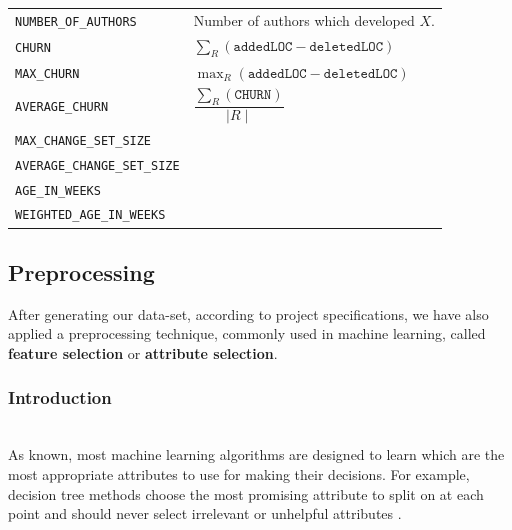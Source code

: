 \documentclass[sigconf]{acmart}
\begin{document}
\begin{table}
\begin{tabular}{l|p{6cm}}
\texttt{NUMBER\_OF\_AUTHORS} & Number of authors which developed $X$.

\\

\texttt{CHURN} & $\sum_R (\texttt{addedLOC} - \texttt{deletedLOC})$

\\

\texttt{MAX\_CHURN} & $\max_R (\texttt{addedLOC} - \texttt{deletedLOC})$

\\

\texttt{AVERAGE\_CHURN} & $\dfrac{\sum_R (\texttt{CHURN})}{\mid R \mid}$

\\

\texttt{MAX\_CHANGE\_SET\_SIZE} &

\\

\texttt{AVERAGE\_CHANGE\_SET\_SIZE} &

\\

\texttt{AGE\_IN\_WEEKS} & 

\\

\texttt{WEIGHTED\_AGE\_IN\_WEEKS} & 

\\

\bottomrule
\end{tabular}
\end{table}

\subsection{Preprocessing}

After generating our data-set, according to project specifications, we have also applied a preprocessing technique, commonly used in machine learning, called \textbf{feature selection} or \textbf{attribute selection}. 

\subsubsection{Introduction}
\hfill\\
As known, most machine learning algorithms are designed to learn which are the most appropriate attributes to use for making their decisions. For example, decision tree methods choose the most promising attribute to split on at each point and should never select irrelevant or unhelpful attributes \cite{FalessiDataMining}. 
\end{document}
